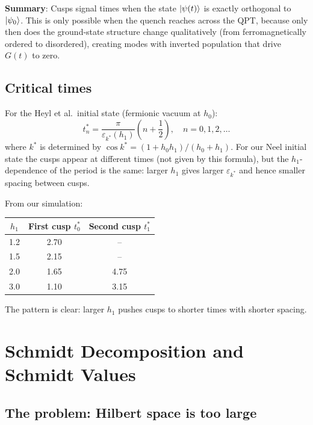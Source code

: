 \documentclass[11pt, a4paper]{article}
\begin{document}
\textbf{Summary}: Cusps signal times when the state $\ket{\psi(t)}$ is exactly orthogonal to $\ket{\psi_0}$. This is only possible when the quench reaches across the QPT, because only then does the ground-state structure change qualitatively (from ferromagnetically ordered to disordered), creating modes with inverted population that drive $G(t)$ to zero.

\subsection{Critical times}

For the Heyl et al.\ initial state (fermionic vacuum at $h_0$):
\begin{equation}
  t^*_n = \frac{\pi}{\varepsilon_{k^*}(h_1)} \left(n + \frac{1}{2}\right), \quad n = 0, 1, 2, \ldots
  \label{eq:cusptimes}
\end{equation}
where $k^*$ is determined by $\cos k^* = (1 + h_0 h_1)/(h_0 + h_1)$. For our Neel initial state the cusps appear at different times (not given by this formula), but the $h_1$-dependence of the period is the same: larger $h_1$ gives larger $\varepsilon_{k^*}$ and hence smaller spacing between cusps.

From our simulation:
\begin{center}
\begin{tabular}{ccc}
\toprule
$h_1$ & First cusp $t^*_0$ & Second cusp $t^*_1$ \\
\midrule
1.2 & 2.70 & -- \\
1.5 & 2.15 & -- \\
2.0 & 1.65 & 4.75 \\
3.0 & 1.10 & 3.15 \\
\bottomrule
\end{tabular}
\end{center}
The pattern is clear: larger $h_1$ pushes cusps to shorter times with shorter spacing.

\section{Schmidt Decomposition and Schmidt Values}
\label{sec:schmidt}

\subsection{The problem: Hilbert space is too large}
\end{document}
